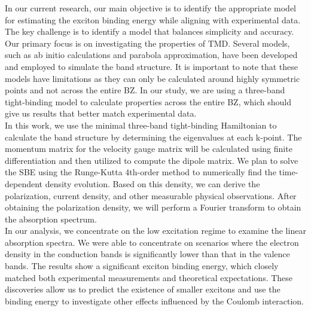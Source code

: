 \documentclass[12pt,english,a4paper]{article}
\begin{document}
\quad In our current research, our main objective is to identify the appropriate model for estimating the exciton binding energy while aligning with experimental data. The key challenge is to identify a model that balances simplicity and accuracy. Our primary focus is on investigating the properties of TMD. Several models, such as ab initio calculations\cite{kirichenko_influence_2021,ramasubramaniam_large_2012,qiu_optical_2013,cheiwchanchamnangij_quasiparticle_2012,shi_quasiparticle_2013} and parabola approximation\cite{meckbach_ultrafast_2020,berkelbach_theory_2013}, have been developed and employed to simulate the band structure. It is important to note that these models have limitations as they can only be calculated around highly symmetric points and not across the entire \ac{BZ}. In our study, we are using a three-band tight-binding model to calculate properties across the entire BZ, which should give us results that better match experimental data.\\\null
\quad In this work, we use the minimal three-band tight-binding Hamiltonian\cite{liu_three-band_2013} to calculate the band structure by determining the eigenvalues at each k-point. The momentum matrix for the velocity gauge matrix will be calculated using finite differentiation and then utilized to compute the dipole matrix. We plan to solve the \ac{SBE} using the Runge-Kutta 4th-order method to numerically find the time-dependent density evolution. Based on this density, we can derive the polarization, current density, and other measurable physical observations. After obtaining the polarization density, we will perform a Fourier transform to obtain the absorption spectrum.\\\null	
\quad In our analysis, we concentrate on the low excitation regime to examine the linear absorption spectra. We were able to concentrate on scenarios where the electron density in the conduction bands is significantly lower than that in the valence bands. The results show a significant exciton binding energy, which closely matched both experimental measurements and theoretical expectations. These discoveries allow us to predict the existence of smaller excitons and use the binding energy to investigate other effects influenced by the Coulomb interaction.\\
\end{document}
